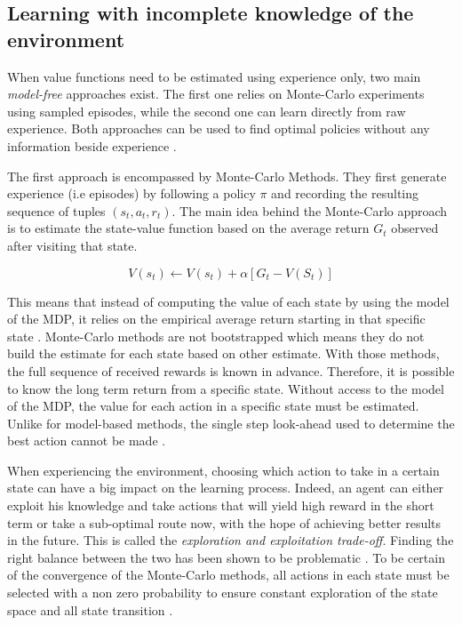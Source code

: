 
\subsection{Learning with incomplete knowledge of the environment} 

When value functions need to be estimated using experience only, two main \textit{model-free} approaches exist. The first one relies on Monte-Carlo experiments using sampled episodes, while the second one can learn directly from raw experience. Both approaches can be used to find optimal policies without any information beside experience \cite[p.~98]{sutton_reinforcement_1998}.

The first approach is encompassed by Monte-Carlo Methods. They first generate experience (i.e episodes) by following a policy $\pi$ and recording the resulting sequence of tuples $(s_t, a_t , r_t)$. The main idea behind the Monte-Carlo approach is to estimate the state-value function based on the average return $G_t$ observed after visiting that state. 

$$V(s_t) \longleftarrow V(s_t) + \alpha[G_t - V(S_t)]$$ 

This means that instead of computing the value of each state by using the model of the MDP, it relies on the empirical average return starting in that specific state \cite[p.~115]{sutton_reinforcement_1998}. Monte-Carlo methods are not bootstrapped which means they do not build the estimate for each state based on other estimate. With those methods, the full sequence of received rewards is known in advance. Therefore, it is possible to know the long term return from a specific state. Without access to the model of the MDP, the value for each action in a specific state must be estimated. Unlike for model-based methods, the single step look-ahead used to determine the best action cannot be made \cite[p.~96]{sutton_reinforcement_1998}. 

When experiencing the environment, choosing which action to take in a certain state can have a big impact on the learning process. Indeed, an agent can either exploit his knowledge and take actions that will yield high reward in the short term or take a sub-optimal route now, with the hope of achieving better results in the future. This is called the \textit{exploration and exploitation trade-off}. 
Finding the right balance between the two has been shown to be problematic \cite{sutton_reinforcement_1998, bloembergen_evolutionary_2015}. To be certain of the convergence of the Monte-Carlo methods, all actions in each state must be selected with a non zero probability to ensure constant exploration of the state space and all state transition \cite[p.~97]{sutton_reinforcement_1998}. 


